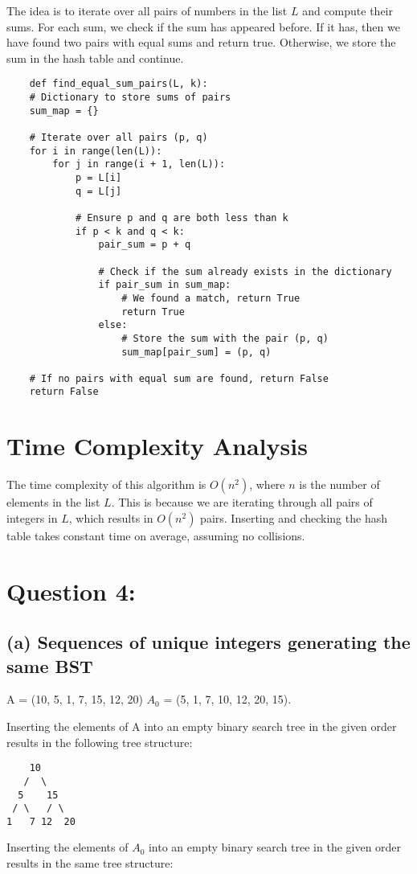 \documentclass{article}
\begin{document}
The idea is to iterate over all pairs of numbers in the list \( L \) and compute their sums. For each sum, we check if the sum has appeared before. If it has, then we have found two pairs with equal sums and return true. Otherwise, we store the sum in the hash table and continue.

\begin{verbatim}
    def find_equal_sum_pairs(L, k):
    # Dictionary to store sums of pairs
    sum_map = {}

    # Iterate over all pairs (p, q)
    for i in range(len(L)):
        for j in range(i + 1, len(L)):
            p = L[i]
            q = L[j]
            
            # Ensure p and q are both less than k
            if p < k and q < k:
                pair_sum = p + q
                
                # Check if the sum already exists in the dictionary
                if pair_sum in sum_map:
                    # We found a match, return True
                    return True
                else:
                    # Store the sum with the pair (p, q)
                    sum_map[pair_sum] = (p, q)

    # If no pairs with equal sum are found, return False
    return False
\end{verbatim}

\section*{Time Complexity Analysis}
The time complexity of this algorithm is \( O(n^2) \), where \( n \) is the number of elements in the list \( L \). This is because we are iterating through all pairs of integers in \( L \), which results in \( O(n^2) \) pairs. Inserting and checking the hash table takes constant time on average, assuming no collisions.


\pagebreak
\section*{Question 4:}
\subsection*{(a) Sequences of unique integers generating the same BST}

 A = (10, 5, 1, 7, 15, 12, 20)  $A_0$ = (5, 1, 7, 10, 12, 20, 15).

Inserting the elements of A into an empty binary search tree in the given order results in the following tree structure:
\begin{verbatim}
    10
   /  \
  5    15
 / \   / \
1   7 12  20
\end{verbatim}
 Inserting the elements of $A_0$ into an empty binary search tree in the given order results in the same tree structure:
\end{document}
